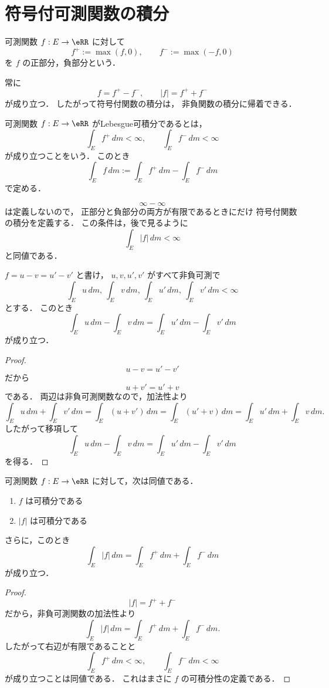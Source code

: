 \section{符号付可測関数の積分}

\begin{definition}[正部分と負部分]
可測関数 $f:E \to \eRR$ に対して
\[
f^+:=\max(f,0),
\qquad
f^-:=\max(-f,0)
\]
を $f$ の正部分，負部分という．
\end{definition}

\begin{remark}
常に
\[
f=f^+-f^-,
\qquad
|f|=f^++f^-
\]
が成り立つ．
したがって符号付関数の積分は，
非負関数の積分に帰着できる．
\end{remark}

\begin{definition}[可積分関数]
可測関数 $f:E \to \eRR$ がLebesgue可積分であるとは，
\[
\int_E f^+\,dm<\infty,
\qquad
\int_E f^-\,dm<\infty
\]
が成り立つことをいう．
このとき
\[
\int_E f\,dm
:=
\int_E f^+\,dm-\int_E f^-\,dm
\]
で定める．
\end{definition}

\begin{remark}
\[
\infty-\infty
\]
は定義しないので，
正部分と負部分の両方が有限であるときにだけ
符号付関数の積分を定義する．
この条件は，後で見るように
\[
\int_E |f|\,dm<\infty
\]
と同値である．
\end{remark}

\begin{proposition}[表示の独立性]
$f=u-v=u'-v'$ と書け，
$u,v,u',v'$ がすべて非負可測で
\[
\int_E u\,dm,\ \int_E v\,dm,\ \int_E u'\,dm,\ \int_E v'\,dm<\infty
\]
とする．
このとき
\[
\int_E u\,dm-\int_E v\,dm
=
\int_E u'\,dm-\int_E v'\,dm
\]
が成り立つ．
\end{proposition}
\begin{proof}
\[
u-v=u'-v'
\]
だから
\[
u+v'=u'+v
\]
である．
両辺は非負可測関数なので，加法性より
\[
\int_E u\,dm+\int_E v'\,dm
=
\int_E (u+v')\,dm
=
\int_E (u'+v)\,dm
=
\int_E u'\,dm+\int_E v\,dm.
\]
したがって移項して
\[
\int_E u\,dm-\int_E v\,dm
=
\int_E u'\,dm-\int_E v'\,dm
\]
を得る．
\end{proof}

\begin{theorem}[可積分性と絶対値]
可測関数 $f:E \to \eRR$ に対して，次は同値である．
\begin{enumerate}
    \item $f$ は可積分である
    \item $|f|$ は可積分である
\end{enumerate}
さらに，このとき
\[
\int_E |f|\,dm
=
\int_E f^+\,dm+\int_E f^-\,dm
\]
が成り立つ．
\end{theorem}
\begin{proof}
\[
|f|=f^++f^-
\]
だから，非負可測関数の加法性より
\[
\int_E |f|\,dm
=
\int_E f^+\,dm+\int_E f^-\,dm.
\]
したがって右辺が有限であることと
\[
\int_E f^+\,dm<\infty,\qquad \int_E f^-\,dm<\infty
\]
が成り立つことは同値である．
これはまさに $f$ の可積分性の定義である．
\end{proof}

